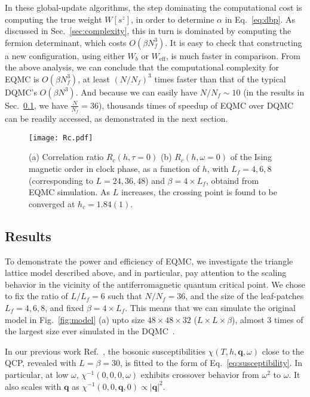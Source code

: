 \documentclass[aps,prx,twocolumn,superscriptaddress,showpacs,floatfix]{revtex4-1}
\begin{document}
In these global-update algorithms, the step dominating the computational cost is computing the true weight $W[s^z]$, in order to determine $\alpha$ in Eq.~\eqref{eq:dbp}.
As discussed in Sec.~\ref{sec:complexity}, this in turn is dominated by computing the fermion determinant, which costs $O(\beta N_f^3)$.
It is easy to check that constructing a new configuration, using either $W_b$ or $W_{\text{eff}}$, is much faster in comparison. From the above analysis, we can conclude that the computational complexity for EQMC is $O( \beta N_f^3)$, at least $(N/N_f)^3$ times faster than that of the typical DQMC's $O( \beta N^3)$. And because we can easily have $N/N_f \sim 10$ (in the results in Sec.~\ref{sec:results}, we have $\frac{N}{N_f}=36$), thousands times of speedup of EQMC over DQMC can be readily accessed, as demonstrated in the next section.

\begin{figure}[htp]
\centering
\texttt{[image: Rc.pdf]}
\caption{(a) Correlation ratio $R_c(h,\tau=0)$ (b) $R_c(h,\omega=0)$ of the Ising magnetic order in clock phase, as a function of $h$, with $L_f=4,6,8$ (corresponding to $L=24,36,48$) and $\beta=4\times L_f$, obtaind from EQMC simulation. As $L$ increases, the crossing point is found to be converged at $h_c=1.84(1)$.}
\label{fig:correlationratio}
\end{figure}

\subsection{Results}
\label{sec:results}
To demonstrate the power and efficiency of EQMC, we investigate the triangle lattice model described above, and in particular, pay attention to the scaling behavior in the vicinity of the antiferromagnetic quantum critical point. We chose to fix the ratio of $L/L_f=6$ such that $N/N_f=36$, and the size of the leaf-patches $L_f=4,6,8$, and fixed $\beta=4\times L_f$. This means that we can simulate the original model in Fig.~\ref{fig:model} (a) upto size $48\times48\times32$ ($L\times L\times \beta$), almost 3 times of the largest size ever simulated in the DQMC~\cite{ZHLiu2017}.

In our previous work Ref.~, the bosonic susceptibilities $\chi(T, h, \bm q, \omega)$ close to the QCP, revealed with $L=\beta=30$, is fitted to the form of Eq.~\eqref{eq:susceptibility}.
In particular, at low $\omega$, $\chi^{-1}(0, 0, 0, \omega)$ exhibits crossover behavior from $\omega^2$ to $\omega$. It also scales with $\bm q$ as $\chi^{-1}(0, 0, \bm q, 0)\propto|\bm q|^2$.
\end{document}
